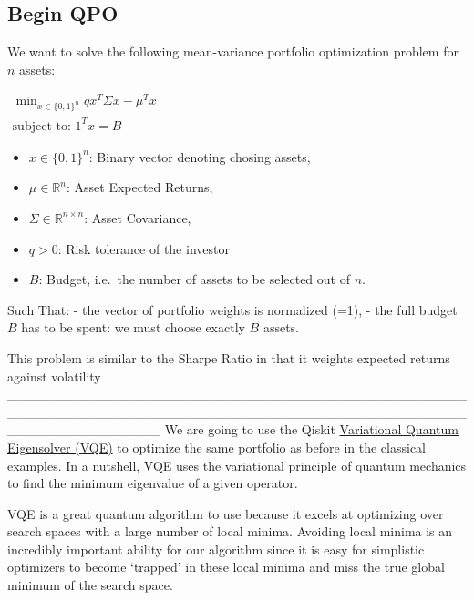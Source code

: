 \documentclass[11pt]{article}
\providecommand{\tightlist}{%
      \setlength{\itemsep}{0pt}\setlength{\parskip}{0pt}}
\begin{document}
    \hypertarget{begin-qpo}{%
\subsection{Begin QPO}\label{begin-qpo}}

We want to solve the following mean-variance portfolio optimization
problem for \(n\) assets:

\(\begin{aligned} \min_{x \in \{0, 1\}^n} q x^T \Sigma x - \mu^T x\\ \text{subject to: } 1^T x = B \end{aligned}\)

\begin{itemize}
\tightlist
\item
  \(x \in \{0, 1\}^n\): Binary vector denoting chosing assets,
\item
  \(\mu \in \mathbb{R}^n\): Asset Expected Returns,
\item
  \(\Sigma \in \mathbb{R}^{n \times n}\): Asset Covariance,
\item
  \(q > 0\): Risk tolerance of the investor
\item
  \(B\): Budget, i.e.~the number of assets to be selected out of \(n\).
\end{itemize}

Such That: - the vector of portfolio weights is normalized (=1), - the
full budget \(B\) has to be spent: we must choose exactly \(B\) assets.

This problem is similar to the Sharpe Ratio in that it weights expected
returns against volatility
\_\_\_\_\_\_\_\_\_\_\_\_\_\_\_\_\_\_\_\_\_\_\_\_\_\_\_\_\_\_\_\_\_\_\_\_\_\_\_\_\_\_\_\_\_\_\_\_\_\_\_\_\_\_\_\_\_\_\_\_\_\_\_\_\_\_\_\_\_\_\_\_\_\_\_\_\_\_\_\_\_\_\_\_\_\_\_\_\_\_\_\_\_\_\_\_\_\_\_\_\_\_\_\_\_\_\_\_\_\_\_\_
We are going to use the Qiskit
\href{https://qiskit.org/textbook/ch-applications/vqe-molecules.html\#varmethod}{Variational
Quantum Eigensolver (VQE)} to optimize the same portfolio as before in
the classical examples. In a nutshell, VQE uses the variational
principle of quantum mechanics to find the minimum eigenvalue of a given
operator.

VQE is a great quantum algorithm to use because it excels at optimizing
over search spaces with a large number of local minima. Avoiding local
minima is an incredibly important ability for our algorithm since it is
easy for simplistic optimizers to become `trapped' in these local minima
and miss the true global minimum of the search space.
\end{document}
